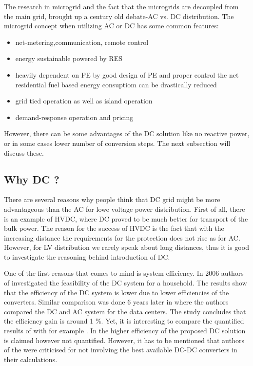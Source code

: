 \documentclass[]{scrartcl}
\begin{document}
The research in microgrid and the fact that the microgrids are decoupled from the main grid, brought up a century old debate-AC vs. DC distribution.  The microgrid concept when utilizing AC or DC has some common features:
\begin{itemize}
	\item net-metering,communication, remote control
	\item energy sustainable powered by RES
	\item heavily dependent on PE
	\subitem by good design of PE and proper control the net residential fuel based energy consuptiom can be drastically reduced
	\item grid tied operation as well as island operation
	\item demand-response operation and pricing
\end{itemize}

However, there can be some advantages of the DC solution like no reactive power, or in some cases lower number of conversion steps.  The next subsection will discuss these.
\newpage
\subsection{Why DC ? }

There are several reasons why people think that DC grid might be more advantageous than the AC for lowe voltage power distribution. First of all, there is an example of HVDC, where DC proved to be much better for transport of the bulk power. The reason for the success of HVDC is the fact that with the increasing distance the requirements for the protection does not rise as for AC\cite{Garrity2009}. However, for LV distribution we rarely speak about long distances, thus it is good to investigate the reasoning behind introduction of DC.

 One of the first reasons that comes to mind is system efficiency. In 2006 authors of \cite{Engelen2006a}  investigated the feasibility of the DC system for a household. The results show that the efficiency of the DC system is lower due to lower efficiencies of the converters. Similar comparison was done 6 years later in \cite{Paper2012} where the authors compared the DC and AC system for the data centers. The study concludes that the efficiency gain is around 1 \%. Yet, it is interesting to compare the quantified results of \cite{Paper2012} with for example \cite{Mondal2012}. In \cite{Mondal2012} the higher efficiency of the proposed DC solution is claimed however not quantified.  However, it has to be mentioned that authors of the \cite{Paper2012} were criticised for not involving the best available DC-DC converters in their calculations.
\end{document}
